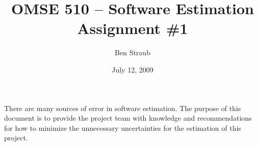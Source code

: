 \documentclass[11pt]{article}
\newif\ifblockcomment
\begin{document}
\ifblockcomment
You are working with a development team on a large software project.  The project is creating a web
based three-dimensional modeling tool.  This system will allow registered users to create and
manipulate three-dimensional objects via a web browser.  Because this is a project with a great deal
of high-level (shareholder) interest, the team has been instructed to provide estimates for the
project at each stage of the software development life cycle.

Your job is not to help the team estimate the project but to help the team minimize the factors that
add to the uncertainty of their estimates at each stage of the project.  So for each stage of the
software development life cycle (you may assume a waterfall type life cycle), describe the factors
that you think will contribute to the uncertainty of the team’s estimate and why the factor impacts
the reliability of the estimate.  Then describe what the team can do to minimize the effect of the
given factors.  If there is no way to minimize the effect of a factor, explain why that is the case.

Please submit your recommendations to the team in a Word document via Blackboard’s assignment
mechanism.

Please contact Chris Gilmore (via email or Blackboard) for any questions you may have about the
assignment.
\fi

\title{OMSE 510 -- Software Estimation\\Assignment \#1}
\author{Ben Straub}
\date{July 12, 2009}
\maketitle


There are many sources of error in software estimation.  The purpose of this document is to provide
the project team with knowledge and recommendations for how to minimize the unnecessary
uncertainties for the estimation of this project.
\end{document}
